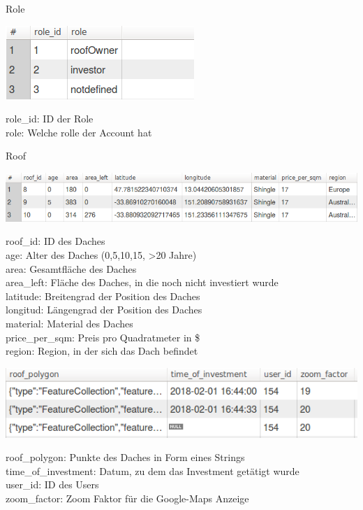 \documentclass[12pt,a4paper]{article}
\begin{document}
\textbullet Role

\includegraphics[scale=0.5]{./Graphics/role}

\noindent \textbullet role\_id: ID der Role\\
\textbullet role: Welche rolle der Account hat
\bigskip

\textbullet Roof

\includegraphics[scale=0.5]{./Graphics/roof1}

\noindent \textbullet roof\_id: ID des Daches\\
\textbullet age: Alter des Daches (0,5,10,15, >20 Jahre)\\
\textbullet area: Gesamtfläche des Daches\\
\textbullet area\_left: Fläche des Daches, in die noch nicht investiert wurde\\
\textbullet latitude: Breitengrad der Position des Daches\\
\textbullet longitud: Längengrad der Position des Daches\\
\textbullet material: Material des Daches\\
\textbullet price\_per\_sqm: Preis pro Quadratmeter in \$ \\
\textbullet region: Region, in der sich das Dach befindet\\
\bigskip

\includegraphics[scale=0.5]{./Graphics/roof2}

\noindent \textbullet roof\_polygon: Punkte des Daches in Form eines Strings\\
\textbullet time\_of\_investment: Datum, zu dem das Investment getätigt wurde\\
\textbullet user\_id: ID des Users\\
\textbullet zoom\_factor: Zoom Faktor für die Google-Maps Anzeige\\
\bigskip
\end{document}

